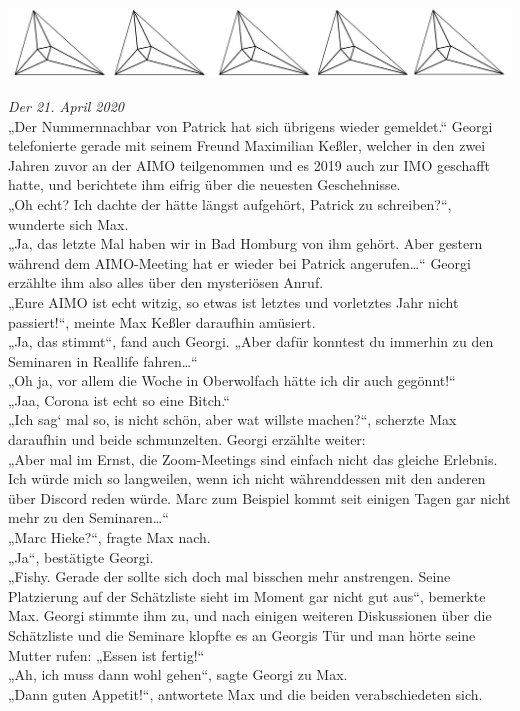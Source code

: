 \documentclass[oneside]{memoir}
\newcommand{\parasep}{
\bigskip
\bigskip
\begin{center} 
   \includegraphics[scale=.08]{parasep5.jpg} 
\end{center}
\bigskip
\bigskip
}
\begin{document}
\parasep

\textit{Der 21. April 2020} \\ 
„Der Nummernnachbar von Patrick hat sich übrigens wieder gemeldet.“ Georgi telefonierte gerade mit seinem Freund Maximilian Keßler, welcher in den zwei Jahren zuvor an der AIMO teilgenommen und es 2019 auch zur IMO geschafft hatte, und berichtete ihm eifrig über die neuesten Geschehnisse. \\
 „Oh echt? Ich dachte der hätte längst aufgehört, Patrick zu schreiben?“, wunderte sich Max. \\
 „Ja, das letzte Mal haben wir in Bad Homburg von ihm gehört. Aber gestern während dem AIMO-Meeting hat er wieder bei Patrick angerufen\ldots“ Georgi erzählte ihm also alles über den mysteriösen Anruf. \\
 „Eure AIMO ist echt witzig, so etwas ist letztes und vorletztes Jahr nicht passiert!“, meinte Max Keßler daraufhin amüsiert. \\
 „Ja, das stimmt“, fand auch Georgi. „Aber dafür konntest du immerhin zu den Seminaren in Reallife fahren\ldots“ \\
  „Oh ja, vor allem die Woche in Oberwolfach hätte ich dir auch gegönnt!“ \\
   „Jaa, Corona ist echt so eine Bitch.“ \\
    „Ich sag‘ mal so, is nicht schön, aber wat willste machen?“, scherzte Max daraufhin und beide schmunzelten. Georgi erzählte weiter: \\
    „Aber mal im Ernst, die Zoom-Meetings sind einfach nicht das gleiche Erlebnis. Ich würde mich so langweilen, wenn ich nicht währenddessen mit den anderen über Discord reden würde. Marc zum Beispiel kommt seit einigen Tagen gar nicht mehr zu den Seminaren\ldots“ \\
    „Marc Hieke?“, fragte Max nach. \\
     „Ja“, bestätigte Georgi. \\
     „Fishy. Gerade der sollte sich doch mal bisschen mehr anstrengen. Seine Platzierung auf der Schätzliste sieht im Moment gar nicht gut aus“, bemerkte Max. Georgi stimmte ihm zu, und nach einigen weiteren Diskussionen über die Schätzliste und die Seminare klopfte es an Georgis Tür und man hörte seine Mutter rufen: „Essen ist fertig!“ \\
     „Ah, ich muss dann wohl gehen“, sagte Georgi zu Max. \\
     „Dann guten Appetit!“, antwortete Max und die beiden verabschiedeten sich.
     
\end{document}
